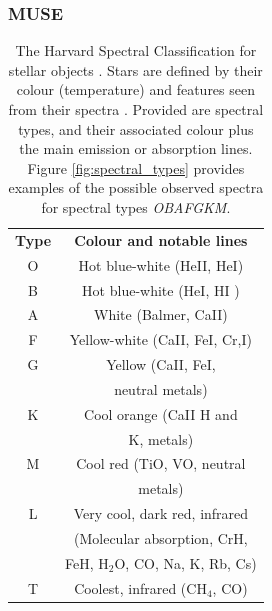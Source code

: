 \documentclass[12pt, twocolumn]{revtex4-1}    %
\begin{document}
\subsubsection{MUSE}


\begin{table}
\begin{center}
\begin{tabular}{c@{\hskip 20pt}c} 
 \hline
 \textbf{Type} & \textbf{Colour and notable lines} \\ [0.5ex] 
 O & Hot blue-white (HeII, HeI) \\
 B & Hot blue-white (HeI, HI ) \\
 A & White (Balmer, CaII) \\
 F & Yellow-white (CaII, FeI, Cr,I) \\
 G & Yellow (CaII, FeI,  \\
  & neutral metals) \\
 K & Cool orange (CaII H and \\ 
  & K, metals) \\
 M & Cool red (TiO, VO, neutral \\
  & metals) \\
 L & Very cool, dark red, infrared \\
  & (Molecular absorption, CrH, \\
  & FeH, H$_2$O, CO, Na, K, Rb, Cs) \\
 T & Coolest, infrared (CH$_4$, CO) \\
 \hline
\end{tabular}
\caption{The Harvard Spectral Classification for stellar objects \citep{1916AnHar..76...19C}. Stars are defined by their colour (temperature) and features seen from their spectra \citep{stellar_colour, 1925PhDT.........1P}. Provided are spectral types, and their associated colour plus the main emission or absorption lines. Figure \ref{fig:spectral_types} provides examples of the possible observed spectra for spectral types \textit{OBAFGKM}.}
\label{table:spectral_classification}
\end{center}
\end{table}
\end{document}
